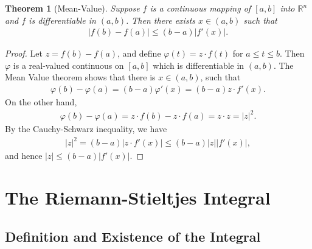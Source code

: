 \documentclass[11pt]{book}
\newtheorem{theorem}{Theorem}[chapter]
\theoremstyle{definition}
\numberwithin{equation}{chapter}
\begin{document}
\medskip

\begin{theorem}[Mean-Value]\label{th_414}
Suppose $f$ is a continuous mapping of $[a,b]$ into $\mathbb{R}^n$ and $f$ is differentiable in $(a,b)$. Then there exists $x \in (a,b)$ such that
\begin{align*}
    \left|f(b) - f(a)\right| \leq (b - a) \left|f'(x)\right|.
\end{align*}
\end{theorem}
\begin{proof}
Let $z = f(b) - f(a)$, and define $\varphi(t) = z \cdot f(t)$ for $a \leq t \leq b$. Then $\varphi$ is a real-valued continuous on $[a,b]$ which is differentiable in $(a,b)$. The Mean Value theorem shows that there is $x \in (a,b)$, such that
\begin{align*}
    \varphi(b) - \varphi(a) = (b - a) \varphi'(x) = (b - a) z \cdot f'(x).
\end{align*}
On the other hand,
\begin{align*}
    \varphi(b) - \varphi(a) = z \cdot f(b) - z \cdot f(a) = z \cdot z = \left|z\right|^2.
\end{align*}
By the Cauchy-Schwarz inequality, we have
\begin{align*}
    \left|z\right|^2 = (b - a)  \left|z \cdot f'(x)\right| \leq (b - a) \left|z\right| \left|f'(x)\right|,
\end{align*}
and hence $\left|z\right| \leq (b - a) \left|f'(x)\right|$.
\end{proof}







\chapter{The Riemann-Stieltjes Integral}

\section{Definition and Existence of the Integral}
\end{document}
